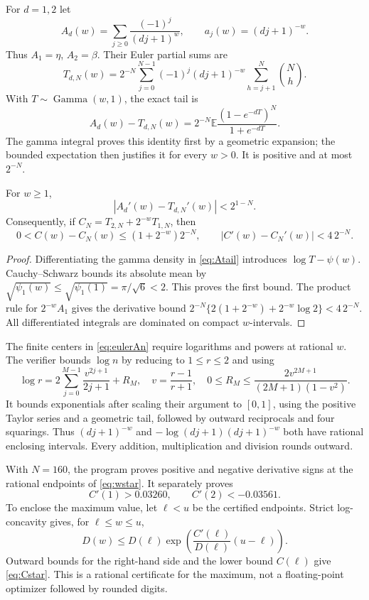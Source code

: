 For $d=1,2$ let
\[
 A_d(w)=\sum_{j\ge0}\frac{(-1)^j}{(dj+1)^w},\qquad
 a_j(w)=(dj+1)^{-w}.
\]
Thus $A_1=\eta$, $A_2=\beta$. Their Euler partial sums are
\begin{equation}\label{eq:eulerAn}
 T_{d,N}(w)=2^{-N}\sum_{j=0}^{N-1}(-1)^j(dj+1)^{-w}
                \sum_{h=j+1}^N\binom Nh.
\end{equation}
With $T\sim\operatorname{Gamma}(w,1)$, the exact tail is
\begin{equation}\label{eq:Atail}
 A_d(w)-T_{d,N}(w)
 =2^{-N}\mathbb E\frac{(1-e^{-dT})^N}{1+e^{-dT}}.
\end{equation}
The gamma integral proves this identity first by a geometric expansion;
the bounded expectation then justifies it for every $w>0$.
It is positive and at most $2^{-N}$.

\begin{lemma}\label{lem:eulerderivative}
For $w\ge1$,
\[
 |A_d'(w)-T_{d,N}'(w)|<2^{1-N}.
\]
Consequently, if $C_N=T_{2,N}+2^{-w}T_{1,N}$, then
\begin{equation}\label{eq:Ccertbounds}
 0<C(w)-C_N(w)\le(1+2^{-w})2^{-N},\qquad
 |C'(w)-C_N'(w)|<4\,2^{-N}.
\end{equation}
\end{lemma}
\begin{proof}
Differentiating the gamma density in \eqref{eq:Atail} introduces
$\log T-\psi(w)$. Cauchy--Schwarz bounds its absolute mean by
$\sqrt{\psi_1(w)}\le\sqrt{\psi_1(1)}=\pi/\sqrt6<2$.
This proves the first bound. The product rule for $2^{-w}A_1$ gives
the derivative bound
$2^{-N}\{2(1+2^{-w})+2^{-w}\log2\}<4\,2^{-N}$.
All differentiated integrals are dominated on compact $w$-intervals.
\end{proof}

The finite centers in \eqref{eq:eulerAn} require logarithms and powers
at rational $w$. The verifier bounds $\log n$ by reducing to $1\le r\le2$
and using
\[
 \log r=2\sum_{j=0}^{M-1}\frac{v^{2j+1}}{2j+1}+R_M,
 \quad v=\frac{r-1}{r+1},\quad
 0\le R_M\le\frac{2v^{2M+1}}{(2M+1)(1-v^2)}.
\]
It bounds exponentials after scaling their argument to $[0,1]$, using
the positive Taylor series and a geometric tail, followed by outward
reciprocals and four squarings. Thus $(dj+1)^{-w}$ and
$-\log(dj+1)(dj+1)^{-w}$ both have rational enclosing intervals.
Every addition, multiplication and division rounds outward.

With $N=160$, the program proves positive and negative derivative
signs at the rational endpoints of \eqref{eq:wstar}. It separately proves
\[
 C'(1)>0.03260,\qquad C'(2)<-0.03561.
\]
To enclose the maximum value, let $\ell<u$ be the certified endpoints.
Strict log-concavity gives, for $\ell\le w\le u$,
\[
 D(w)\le D(\ell)
 \exp\!\left(\frac{C'(\ell)}{D(\ell)}(u-\ell)\right).
\]
Outward bounds for the right-hand side and the lower bound $C(\ell)$
give \eqref{eq:Cstar}. This is a rational certificate for the maximum,
not a floating-point optimizer followed by rounded digits.

